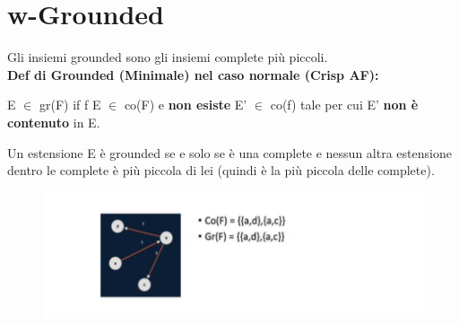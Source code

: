 \section{w-Grounded}
Gli insiemi grounded sono gli insiemi complete più piccoli. \\\textbf{Def di
    Grounded (Minimale) nel caso normale (Crisp AF):}
\begin{center}
    E $\in$ gr(F) if f E $\in$ co(F) e \textbf{non esiste} E' $\in$ co(f)
    tale per cui E' \textbf{non è contenuto} in E.
\end{center}
Un estensione E è grounded se e solo se è una complete e nessun altra
estensione dentro le complete è più piccola di lei (quindi è la più piccola
delle complete).
\begin{figure}[H]
    \centering
    \includegraphics[width=14cm, keepaspectratio]{img/Cap6/w-grounded.png}
\end{figure}

